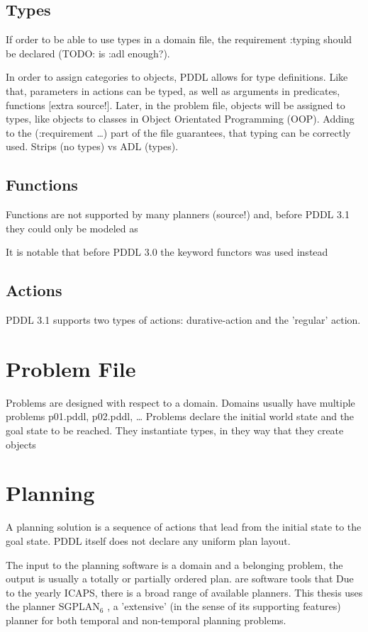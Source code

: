 \documentclass[11pt]{report}
\begin{document}
\subsection{Types}
\label{sec-3-1-3}

If order to be able to use types in a domain file, the
requirement :typing should be declared (TODO: is :adl enough?).

In order to assign categories to objects, PDDL allows for
type definitions. Like that, parameters in actions can be typed, as
well as arguments in predicates, functions [extra source!]. Later, in
the problem file, objects will be assigned to types, like objects to
classes in Object Orientated Programming (OOP). Adding to the
(:requirement \ldots{}) part of the file guarantees, that typing can be
correctly used. Strips (no types) vs ADL (types).

\subsection{Functions}
\label{sec-3-1-4}
Functions are not supported by many planners (source!) and, before
PDDL 3.1 they could only be modeled as 

It is notable that before PDDL 3.0 the keyword functors was used instead
\subsection{Actions}
\label{sec-3-1-5}
PDDL 3.1 supports two types of actions: durative-action and the
'regular' action.
\section{Problem File}
\label{sec-3-2}

Problems are designed with respect to a domain. Domains usually have
multiple problems p01.pddl, p02.pddl, \ldots{} Problems declare the initial
world state and the goal state to be reached. They instantiate types,
in they way that they create objects 
\section{Planning}
\label{sec-3-3}

A planning solution is a sequence of actions that lead from the
initial state to the goal state. PDDL itself does not declare any
uniform plan layout.

The input to the planning software is a domain and a belonging
problem, the output is usually a totally or partially ordered plan.
are software tools that Due to the yearly ICAPS, there is a broad
range of available planners. This thesis uses the planner SGPLAN\(_{\text{6}}\)
\textcite{hsu2008sgplan}, a 'extensive' (in the sense of its
supporting features) planner for both temporal and non-temporal
planning problems.
\end{document}
